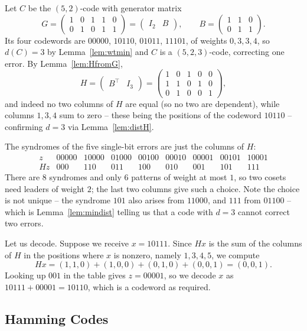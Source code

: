 \documentclass[a4paper]{scrartcl}
\begin{document}
\begin{example}\label{ex:syndrome523}
	Let $C$ be the $(5,2)$-code with generator matrix
	$$G = \begin{pmatrix} 1&0&1&1&0\\0&1&0&1&1\end{pmatrix} = \begin{pmatrix} I_2 & B \end{pmatrix}, \qquad B = \begin{pmatrix}1&1&0\\0&1&1\end{pmatrix}.$$
	Its four codewords are $00000$, $10110$, $01011$, $11101$, of weights $0,3,3,4$, so $d(C)=3$ by Lemma~\ref{lem:wtmin} and $C$ is a $(5,2,3)$-code, correcting one error. By Lemma~\ref{lem:HfromG},
	$$H = \begin{pmatrix} B^\top & I_3\end{pmatrix} = \begin{pmatrix} 1&0&1&0&0\\1&1&0&1&0\\0&1&0&0&1\end{pmatrix},$$
	and indeed no two columns of $H$ are equal (so no two are dependent), while columns $1,3,4$ sum to zero -- these being the positions of the codeword $10110$ -- confirming $d = 3$ via Lemma~\ref{lem:distH}.

	The syndromes of the five single-bit errors are just the columns of $H$:
	$$\begin{array}{c|cccccccc}
		z & 00000 & 10000 & 01000 & 00100 & 00010 & 00001 & 00101 & 10001\\\hline
		Hz & 000 & 110 & 011 & 100 & 010 & 001 & 101 & 111
	\end{array}$$
	There are $8$ syndromes and only $6$ patterns of weight at most $1$, so two cosets need leaders of weight $2$; the last two columns give such a choice. Note the choice is not unique -- the syndrome $101$ also arises from $11000$, and $111$ from $01100$ -- which is Lemma~\ref{lem:mindist} telling us that a code with $d = 3$ cannot correct two errors.

	Let us decode. Suppose we receive $x = 10111$. Since $Hx$ is the sum of the columns of $H$ in the positions where $x$ is nonzero, namely $1,3,4,5$, we compute
	$$Hx = (1,1,0)+(1,0,0)+(0,1,0)+(0,0,1) = (0,0,1).$$
	Looking up $001$ in the table gives $z = 00001$, so we decode $x$ as $10111+00001 = 10110$, which is a codeword as required.
\end{example}

\subsection{Hamming Codes}
\end{document}
